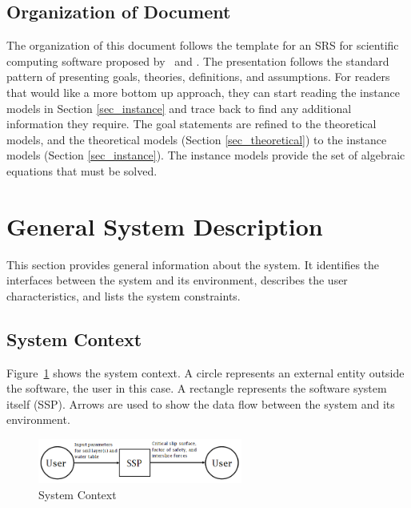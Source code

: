 \documentclass[12pt]{article}
\newcommand{\progname}{SSP}
\begin{document}
\subsection{Organization of Document}

The organization of this document follows the template for an SRS for
scientific computing software proposed by~\cite{Koothoor2013} and
\cite{SmithAndLai2005}.  The presentation follows the standard pattern
of presenting goals, theories, definitions, and assumptions.  For
readers that would like a more bottom up approach, they can start
reading the instance models in Section \ref{sec_instance} and trace
back to find any additional information they require. The goal statements 
are refined to the theoretical models, and the theoretical models (Section 
\ref{sec_theoretical}) to the instance models (Section \ref{sec_instance}). The 
instance models provide the set of algebraic equations that must be solved.


\section{General System Description}

This section provides general information about the system. It identifies the 
interfaces between the system and its environment, describes the user 
characteristics, and lists the system constraints.

\subsection{System Context}

Figure~\ref{Fig_SystemContext} shows the system context.  A circle represents an
external entity outside the software, the user in this case.  A rectangle
represents the software system itself (\progname).  Arrows are used to show the 
data flow between the system and its environment.

\begin{figure}[h!]
	\begin{center}
		\includegraphics[width=0.6\textwidth]{SystemContextFigure.png}
		\caption{System Context}
		\label{Fig_SystemContext}
	\end{center}
\end{figure}
\end{document}
